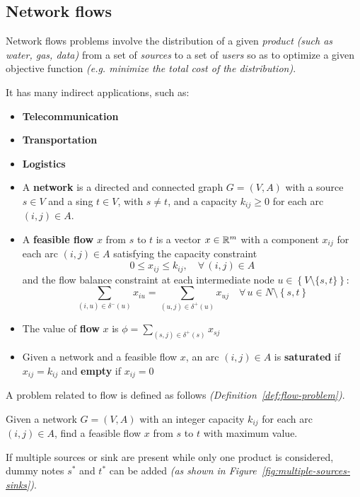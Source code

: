 \documentclass[english]{article}
\begin{document}
\subsection{Network flows}

Network flows problems involve the distribution of a given \textit{product} \textit{(such as water, gas, data)} from a set of \textit{sources} to a set of \textit{users} so as to optimize a given objective function \textit{(e.g. minimize the total cost of the distribution)}.

It has many indirect applications, such as:

\begin{itemize}
  \item \textbf{Telecommunication}
  \item \textbf{Transportation}
  \item \textbf{Logistics}
\end{itemize}

\begin{itemize}
  \item A \textbf{network} is a directed and connected graph \(G = (V, A)\) with a source \(s \in V\) and a sing \(t \in V\), with \(s \neq t\), and a capacity \(k_{ij} \geq 0\) for each arc \((i, j) \in A\).
  \item A \textbf{feasible flow} \(x\) from \(s\) to \(t\) is a vector \(x \in \mathbb{R}^m\) with a component \(x_{ij}\) for each arc \((i, j) \in A\) satisfying the capacity constraint \[0 \leq x_{ij} \leq k_{ij}, \quad \forall \, \left( i, j \right) \in A\]
        and the flow balance constraint at each intermediate node \(u \in \left\{ V \setminus \{s, t\} \right\}\):
        \[\displaystyle \sum_{\left( i, u \right) \in \delta^{-}(u)} x_{iu} = \displaystyle \sum_{\left( u, j \right) \in \delta^{+}(u)} x_{uj} \quad \forall \, u \in N \setminus \left\{ s, t \right\} \]
  \item The value of \textbf{flow} \(x\) is \(\phi = \displaystyle \sum_{\left( s, j \right) \in \delta^{+}(s)} x_{sj}\)
  \item Given a network and a feasible flow \(x\), an arc \(\left( i, j \right) \in A\) is \textbf{saturated} if \(x_{ij} = k_{ij}\) and \textbf{empty} if \(x_{ij} = 0\)
\end{itemize}

\bigskip
A problem related to flow is defined as follows \textit{(Definition~\ref{def:flow-problem})}.
\begin{definition}
  Given a network \(G = \left( V, A \right)\) with an integer capacity \(k_{ij}\) for each arc \((i, j) \in A\), find a feasible flow \(x\) from \(s\) to \(t\) with maximum value.

  If multiple sources or sink are present while only one product is considered, dummy notes \(s^\ast\) and \(t^\ast\) can be added \textit{(as shown in Figure~\ref{fig:multiple-sources-sinks})}.
  \label{def:flow-problem}
\end{definition}
\end{document}
